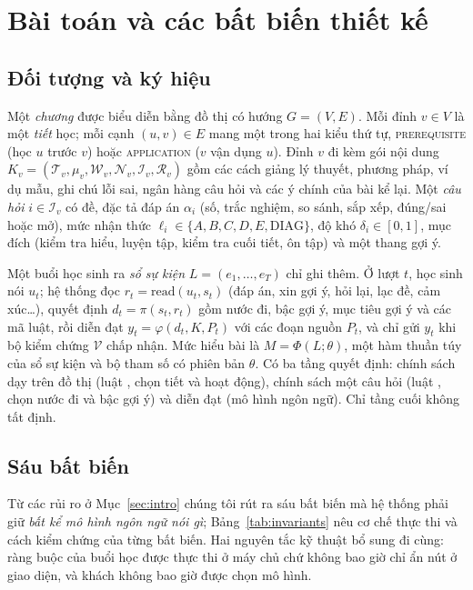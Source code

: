 \section{Bài toán và các bất biến thiết kế}\label{sec:problem}

\subsection{Đối tượng và ký hiệu}
Một \emph{chương} được biểu diễn bằng đồ thị có hướng $G=(V,E)$. Mỗi đỉnh $v\in V$ là một \emph{tiết} học; mỗi cạnh $(u,v)\in E$ mang một trong hai kiểu thứ tự, \textsc{prerequisite} (học $u$ trước $v$) hoặc \textsc{application} ($v$ vận dụng $u$). Đỉnh $v$ đi kèm gói nội dung $K_v=(\mathcal{T}_v,\mu_v,\mathcal{W}_v,\mathcal{N}_v,\mathcal{I}_v,\mathcal{R}_v)$ gồm các cách giảng lý thuyết, phương pháp, ví dụ mẫu, ghi chú lỗi sai, ngân hàng câu hỏi và các ý chính của bài kể lại. Một \emph{câu hỏi} $i\in\mathcal{I}_v$ có đề, đặc tả đáp án $\alpha_i$ (số, trắc nghiệm, so sánh, sắp xếp, đúng/sai hoặc mở), mức nhận thức $\ell_i\in\{A,B,C,D,E,\mathrm{DIAG}\}$, độ khó $\delta_i\in[0,1]$, mục đích (kiểm tra hiểu, luyện tập, kiểm tra cuối tiết, ôn tập) và một thang gợi ý.

Một buổi học sinh ra \emph{sổ sự kiện} $L=(e_1,\dots,e_T)$ chỉ ghi thêm. Ở lượt $t$, học sinh nói $u_t$; hệ thống đọc $r_t=\mathrm{read}(u_t,s_t)$ (đáp án, xin gợi ý, hỏi lại, lạc đề, cảm xúc\dots), quyết định $d_t=\pi(s_t,r_t)$ gồm nước đi, bậc gợi ý, mục tiêu gợi ý và các mã luật, rồi diễn đạt $y_t=\varphi(d_t,K,P_t)$ với các đoạn nguồn $P_t$, và chỉ gửi $y_t$ khi bộ kiểm chứng $\mathcal{V}$ chấp nhận. Mức hiểu bài là $M=\Phi(L;\theta)$, một hàm thuần túy của sổ sự kiện và bộ tham số có phiên bản $\theta$. Có ba tầng quyết định: chính sách dạy trên đồ thị (luật , chọn tiết và hoạt động), chính sách một câu hỏi (luật , chọn nước đi và bậc gợi ý) và diễn đạt (mô hình ngôn ngữ). Chỉ tầng cuối không tất định.

\subsection{Sáu bất biến}
Từ các rủi ro ở Mục~\ref{sec:intro} chúng tôi rút ra sáu bất biến mà hệ thống phải giữ \emph{bất kể mô hình ngôn ngữ nói gì}; Bảng~\ref{tab:invariants} nêu cơ chế thực thi và cách kiểm chứng của từng bất biến. Hai nguyên tắc kỹ thuật bổ sung đi cùng: ràng buộc của buổi học được thực thi ở máy chủ chứ không bao giờ chỉ ẩn nút ở giao diện, và khách không bao giờ được chọn mô hình.

